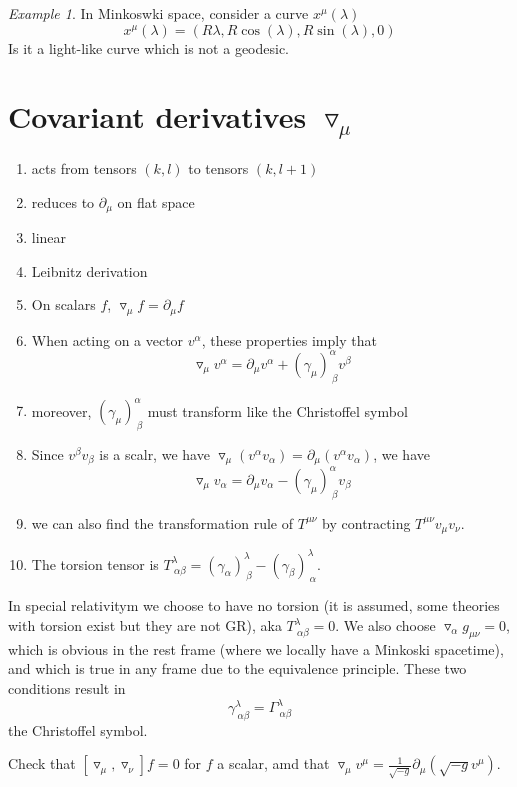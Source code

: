 \documentclass[a4paper]{book}
\theoremstyle{definition}
\theoremstyle{remark}
\newtheorem*{example}{Example}
\begin{document}
\begin{example}
    In Minkoswki space, consider a curve $x^\mu(\lambda)$
    \begin{equation}
        x^\mu(\lambda) = (R\lambda, R\cos(\lambda), R\sin(\lambda), 0)
    \end{equation}
    Is it a light-like curve which is not a geodesic.
\end{example}

\section{Covariant derivatives $\triangledown_\mu$}

\begin{enumerate}
    \item acts from tensors $(k,l)$ to tensors $(k, l+1)$
    \item reduces to $\partial_\mu$ on flat space
    \item linear 
    \item Leibnitz derivation 
    \item On scalars $f$, $\triangledown_\mu f = \partial_\mu f$
    \item When acting on a vector $v^\alpha$, these properties imply that 
        \begin{equation}
        \triangledown_\mu v^\alpha = \partial_\mu v^\alpha + (\gamma_\mu)^\alpha_{~\beta} v^\beta
        \end{equation}
    \item moreover, $(\gamma_\mu)^\alpha_{~\beta}$ must transform like the Christoffel symbol 
    \item Since $v^\beta v_\beta$ is a scalr, we have $\triangledown_\mu (v^\alpha v_\alpha) = \partial_\mu (v^\alpha v_\alpha)$, we have 
    \begin{equation}
        \triangledown_\mu v_\alpha = \partial_\mu v_\alpha - (\gamma_\mu)^\alpha_{~\beta} v_\beta
    \end{equation}
    \item we can also find the transformation rule of $T^{\mu\nu}$ by contracting $T^{\mu\nu}v_{\mu}v_\nu$. 
    \item The torsion tensor is $T^\lambda_{~\alpha\beta} = (\gamma_\alpha)^\lambda_{~\beta} - (\gamma_\beta)^\lambda_{~\alpha}$.
\end{enumerate}

In special relativitym we choose to have no torsion (it is assumed, some theories with torsion exist but they are not GR), aka $T^\lambda_{~\alpha\beta} = 0$. We also choose $\triangledown_\alpha g_{\mu\nu} = 0$, which is obvious in the rest frame (where we locally have a Minkoski spacetime), and which is true in any frame due to the equivalence principle. These two conditions result in 
\begin{equation}
    \gamma^\lambda_{~\alpha\beta} = \Gamma^\lambda_{~\alpha\beta}
\end{equation}
the Christoffel symbol. \par \bigskip 
Check that $[\triangledown_\mu, \triangledown_\nu]f = 0$ for $f$ a scalar, amd that $\triangledown_\mu v^\mu = \frac{1}{\sqrt{-g}}\partial_\mu (\sqrt{-g}v^\mu)$. \par \bigskip 
\end{document}
